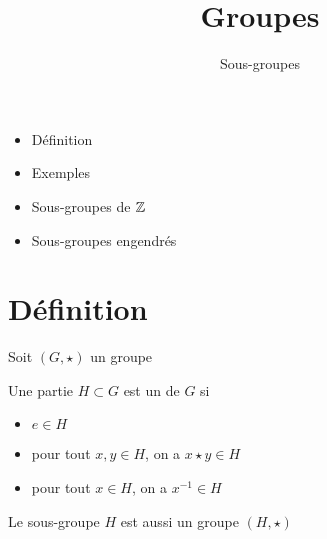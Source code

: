 


\newcommand{\GL}{\mathcal{G}\ell}









\title{{\bf Groupes}}
\subtitle{Sous-groupes}

\begin{frame}
  
  \debutmontitre

  \pause

{\footnotesize
\hfill
{}
\begin{minipage}{0.6\textwidth}
  \begin{itemize}
    \item<3-> Définition
    \item<4-> Exemples
    \item<5-> Sous-groupes de $\mathbb{Z}$
    \item<6-> Sous-groupes engendrés
  \end{itemize}
\end{minipage}
}

\end{frame}

\setcounter{framenumber}{0}




\section{Définition}

\begin{frame}


Soit $(G,\star)$ un groupe
\begin{mydefinition}
Une partie $H \subset G$ est un   de $G$ si 
\begin{itemize}

\pause
  \item $e \in H$
\pause
  \item pour tout $x, y \in H$, on a $x \star y \in H$ 
\pause
  \item pour tout $x \in H$, on a $x^{-1} \in H$
\end{itemize}
\end{mydefinition}

\pause
\bigskip

\begin{remarque}
Le sous-groupe $H$ est aussi un groupe $(H,\star)$ 
\end{remarque}


\end{frame}





